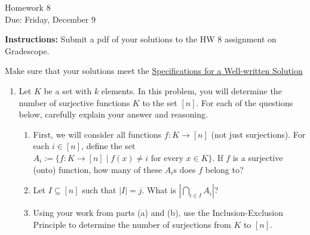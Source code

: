 \documentclass[12pt]{article}
\begin{document}
\begin{center}
{\Large Homework 8}\\
Due: Friday, December 9\\
\end{center}
{\bf Instructions:} Submit a pdf of your solutions to the HW 8 assignment on Gradescope. 

Make sure that your solutions meet the \href{https://docs.google.com/document/d/18LfQoqi6BsY2VdAlpC5xdYEA2rxSGoH0891nVec4_Os/edit?usp=sharing}{Specifications for a Well-written Solution} 

\begin{enumerate}
\item Let $K$ be a set with $k$ elements. In this problem, you will determine the number of surjective functions $K$ to the set $[n]$.  For each of the questions below, carefully explain your answer and reasoning. 
\begin{enumerate}
\item First, we will consider all functions $f:K\to [n]$ (not just surjections). For each $i\in [n]$, define the set $A_i:=\{f:K\to [n]\mid f(x)\ne i \text{ for every } x\in K\}$.  If $f$ is a surjective (onto) function, how many of these $A_i$s does $f$ belong to? 
\item Let $I\subseteq [n]$ such that $|I|=j$. What is $|\bigcap_{i\in I} A_i|$?
\item Using your work from parts (a) and (b), use the Inclusion-Exclusion Principle to determine the number of surjections from $K$ to $[n]$. 
\end{enumerate} 


\end{enumerate}
\end{document}
